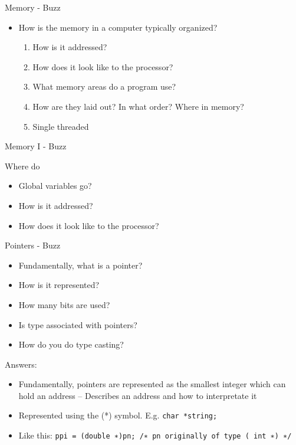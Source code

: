 Memory - Buzz

\begin{itemize}
\item How is the memory in a computer typically organized?
  \begin{enumerate}
    \item How is it addressed?
    \item How does it look like to the processor?
    \item What memory areas do a program use?
    \item How are they laid out? In what order? Where in memory?
    \item Single threaded

  \end{enumerate}
\end{itemize}

Memory I - Buzz

Where do
\begin{itemize}
\item Global variables go?
\item How is it addressed?
\item How does it look like to the processor?
\end{itemize}

Pointers - Buzz

\begin{itemize}
\item Fundamentally, what is a pointer?
\item How is it represented?
\item How many bits are used?
\item Is type associated with pointers?
\item How do you do type casting?
\end{itemize}

Answers:

\begin{itemize}
\item  Fundamentally, pointers are represented as the smallest integer which can hold an address
– Describes an address and how to interpretate it
\item Represented using the (*) symbol. E.g. {\tt char *string; }
\item Like this: {\tt <++>ppi = (double ∗)pn; /∗ pn originally of type ( int ∗) ∗/ }
\end{itemize}
